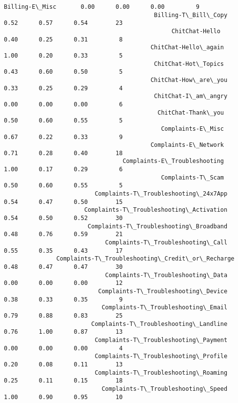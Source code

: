 \documentclass[11pt]{article}
\begin{document}
\begin{Verbatim}[commandchars=\\\{\}]
                                                Billing-E\_Misc       0.00      0.00      0.00         9
                                           Billing-T\_Bill\_Copy       0.52      0.57      0.54        23
                                                ChitChat-Hello       0.40      0.25      0.31         8
                                          ChitChat-Hello\_again       1.00      0.20      0.33         5
                                           ChitChat-Hot\_Topics       0.43      0.60      0.50         5
                                          ChitChat-How\_are\_you       0.33      0.25      0.29         4
                                           ChitChat-I\_am\_angry       0.00      0.00      0.00         6
                                            ChitChat-Thank\_you       0.50      0.60      0.55         5
                                             Complaints-E\_Misc       0.67      0.22      0.33         9
                                          Complaints-E\_Network       0.71      0.28      0.40        18
                                  Complaints-E\_Troubleshooting       1.00      0.17      0.29         6
                                             Complaints-T\_Scam       0.50      0.60      0.55         5
                          Complaints-T\_Troubleshooting\_24x7App       0.54      0.47      0.50        15
                       Complaints-T\_Troubleshooting\_Activation       0.54      0.50      0.52        30
                        Complaints-T\_Troubleshooting\_Broadband       0.48      0.76      0.59        21
                             Complaints-T\_Troubleshooting\_Call       0.55      0.35      0.43        17
               Complaints-T\_Troubleshooting\_Credit\_or\_Recharge       0.48      0.47      0.47        30
                             Complaints-T\_Troubleshooting\_Data       0.00      0.00      0.00        12
                           Complaints-T\_Troubleshooting\_Device       0.38      0.33      0.35         9
                            Complaints-T\_Troubleshooting\_Email       0.79      0.88      0.83        25
                         Complaints-T\_Troubleshooting\_Landline       0.76      1.00      0.87        13
                          Complaints-T\_Troubleshooting\_Payment       0.00      0.00      0.00         4
                          Complaints-T\_Troubleshooting\_Profile       0.20      0.08      0.11        13
                          Complaints-T\_Troubleshooting\_Roaming       0.25      0.11      0.15        18
                            Complaints-T\_Troubleshooting\_Speed       1.00      0.90      0.95        10

\end{Verbatim}
\end{document}
